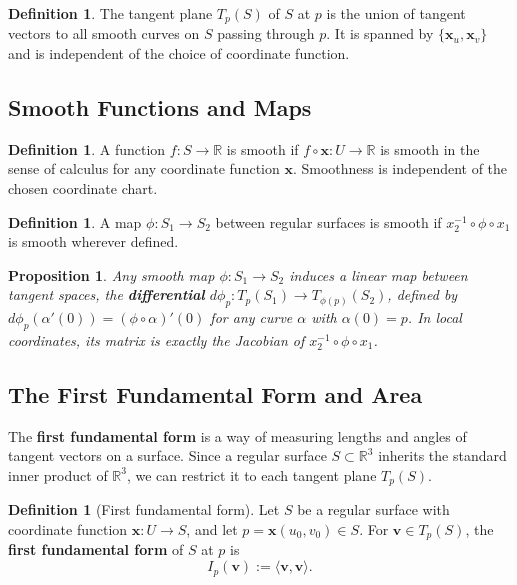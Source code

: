 \documentclass[10pt, a4paper]{article}
\theoremstyle{plain}
\newtheorem{proposition}[theorem]{Proposition}
\theoremstyle{definition}
\newtheorem{definition}[theorem]{Definition}
\theoremstyle{remark}
\begin{document}
\begin{definition}
  The tangent plane $T_p(S)$ of $S$ at $p$ is the union of tangent vectors to all smooth curves on $S$ passing through $p$. It is spanned by $\{\mathbf{x}_u, \mathbf{x}_v\}$ and is independent of the choice of coordinate function.
\end{definition}






\pagebreak
\subsection{Smooth Functions and Maps}

\begin{definition}
  A function $f:S\to\mathbb{R}$ is smooth if $f\circ\mathbf{x}:U\to\mathbb{R}$ is smooth in the sense of calculus for any coordinate function $\mathbf{x}$. Smoothness is independent of the chosen coordinate chart.
\end{definition}

\begin{definition}
  A map $\phi:S_1\to S_2$ between regular surfaces is smooth if $x_2^{-1}\circ\phi\circ x_1$ is smooth wherever defined.
\end{definition}

\begin{proposition}
  Any smooth map $\phi:S_1\to S_2$ induces a linear map between tangent spaces, the \textbf{differential} $d\phi_p : T_p(S_1) \to T_{\phi(p)}(S_2)$, defined by $d\phi_p(\alpha'(0)) = (\phi\circ\alpha)'(0)$ for any curve $\alpha$ with $\alpha(0)=p$. In local coordinates, its matrix is exactly the Jacobian of $x_2^{-1}\circ\phi\circ x_1$.
\end{proposition}


\pagebreak
\pagebreak
\subsection{The First Fundamental Form and Area}

The \textbf{first fundamental form} is a way of measuring lengths and angles of
tangent vectors on a surface. Since a regular surface $S \subset \mathbb{R}^3$
inherits the standard inner product of $\mathbb{R}^3$, we can restrict it to
each tangent plane $T_p(S)$.



\begin{definition}[First fundamental form]
  Let $S$ be a regular surface with coordinate function $\mathbf{x}: U \to S$,
  and let $p = \mathbf{x}(u_0, v_0) \in S$. For $\mathbf{v} \in T_p(S)$, the
  \textbf{first fundamental form} of $S$ at $p$ is
  \[
    I_p(\mathbf{v}) := \langle \mathbf{v}, \mathbf{v} \rangle.
  \]
\end{definition}
\end{document}

